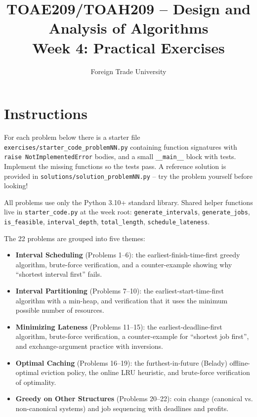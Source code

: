 \documentclass[11pt]{article}
\title{TOAE209/TOAH209 -- Design and Analysis of Algorithms\\[4pt]
\large Week 4: Practical Exercises}
\author{Foreign Trade University}
\date{}
\begin{document}
\maketitle

\section*{Instructions}

For each problem below there is a starter file
\texttt{exercises/starter\_code\_problemNN.py} containing function signatures with
\texttt{raise NotImplementedError} bodies, and a small \texttt{\_\_main\_\_} block with
tests. Implement the missing functions so the tests pass. A reference solution is
provided in \texttt{solutions/solution\_problemNN.py} -- try the problem yourself before
looking!

All problems use only the Python 3.10+ standard library. Shared helper functions live in
\texttt{starter\_code.py} at the week root: \texttt{generate\_intervals},
\texttt{generate\_jobs}, \texttt{is\_feasible}, \texttt{interval\_depth},
\texttt{total\_length}, \texttt{schedule\_lateness}.

The 22 problems are grouped into five themes:
\begin{itemize}
    \item \textbf{Interval Scheduling} (Problems 1--6): the earliest-finish-time-first
    greedy algorithm, brute-force verification, and a counter-example showing why
    ``shortest interval first'' fails.
    \item \textbf{Interval Partitioning} (Problems 7--10): the earliest-start-time-first
    algorithm with a min-heap, and verification that it uses the minimum possible number
    of resources.
    \item \textbf{Minimizing Lateness} (Problems 11--15): the earliest-deadline-first
    algorithm, brute-force verification, a counter-example for ``shortest job first'', and
    exchange-argument practice with inversions.
    \item \textbf{Optimal Caching} (Problems 16--19): the furthest-in-future (Belady)
    offline-optimal eviction policy, the online LRU heuristic, and brute-force
    verification of optimality.
    \item \textbf{Greedy on Other Structures} (Problems 20--22): coin change (canonical
    vs. non-canonical systems) and job sequencing with deadlines and profits.
\end{itemize}

\newpage
\end{document}
